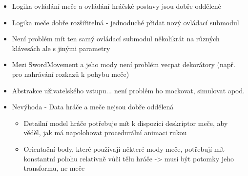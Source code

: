 \begin{itemize}
        \begin{itemize}
            \item Logika ovládání meče a ovládání hráčské postavy jsou dobře oddělené
            \item Logika meče dobře rozšiřitelná - jednoduché přidat nový ovládací submodul
            \item Není problém mít ten samý ovládací submodul několikrát na různých klávesách ale s jinými parametry
            \item Mezi SwordMovement a jeho mody není problém vecpat dekorátory (např. pro nahrávání rozkazů k pohybu meče)
            \item Abstrakce uživatelského vstupu... není problém ho mockovat, simulovat apod.
            \item Nevýhoda - Data hráče a meče nejsou dobře oddělená
                \begin{itemize}
                    \item Detailní model hráče potřebuje mít k dispozici deskriptor meče, aby věděl, jak má napolohovat procedurální animaci rukou
                    \item Orientační body, které používají některé mody meče, potřebují mít konstantní polohu relativně vůči tělu hráče -> musí být potomky jeho transformu, ne meče
                \end{itemize}
        \end{itemize} 
\end{itemize}

